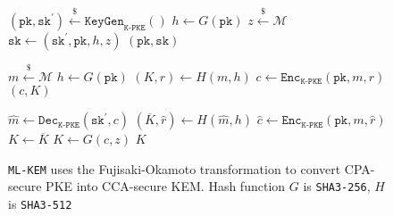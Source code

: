 \documentclass[runningheads]{llncs}
\newcommand{\keygen}{\texttt{KeyGen}}
\newcommand{\encrypt}{\texttt{Enc}}
\newcommand{\decrypt}{\texttt{Dec}}
\newcommand{\encap}{\texttt{Encap}}
\newcommand{\decap}{\texttt{Decap}}
\newcommand{\pk}{\texttt{pk}}
\newcommand{\sk}{\texttt{sk}}
\newcommand{\leftsample}{\stackrel{\$}{\leftarrow}}
\begin{document}
\begin{figure}[h]
    \centering
    
    \begin{minipage}[t]{0.35\textwidth}
        \begin{algorithm}[H]
            \caption*{$\keygen_\texttt{ML-KEM}()$}
            \begin{algorithmic}[1]
                \State $(\pk, \sk^\prime) \leftsample \keygen_\texttt{K-PKE}()$
                \State $h \leftarrow G(\pk)$
                \State $z \leftsample \mathcal{M}$
                \State $\sk \leftarrow (\sk^\prime, \pk, h, z)$
                \State \Return $(\pk, \sk)$
            \end{algorithmic}
        \end{algorithm} \vspace{-0.5cm}
    \end{minipage}
    \begin{minipage}[t]{0.3\textwidth}
        \begin{algorithm}[H]
            \caption*{$\encap_\texttt{ML-KEM}(\pk)$}
            \begin{algorithmic}[1]
                \State $m \leftsample \mathcal{M}$
                \State $h \leftarrow G(\pk)$
                \State $(K, r) \leftarrow H(m, h)$
                \State $c \leftarrow \encrypt_\texttt{K-PKE}(\pk, m ,r)$
                \State \Return $(c, K)$
            \end{algorithmic}
        \end{algorithm}
    \end{minipage}
    \begin{minipage}[t]{0.33\textwidth}
        \begin{algorithm}[H]
            \caption*{$\decap_\texttt{ML-KEM}(\sk, c)$}
            \begin{algorithmic}[1]
                \State $\hat{m} \leftarrow \decrypt_\texttt{K-PKE}(\sk^\prime, c)$
                \State $(\overline{K}, \hat{r}) \leftarrow H(\hat{m}, h)$
                \State $\hat{c} \leftarrow \encrypt_\texttt{K-PKE}(\pk, m, \hat{r})$
                    \State $K \leftarrow \overline{K}$
                \Else 
                    \State $K \leftarrow G(c, z)$
                \EndIf
                \State \Return $K$
            \end{algorithmic}
        \end{algorithm}
    \end{minipage}

    \caption{\texttt{ML-KEM} uses the Fujisaki-Okamoto transformation to convert CPA-secure PKE into CCA-secure KEM. Hash function $G$ is \texttt{SHA3-256}, $H$ is \texttt{SHA3-512}}\label{fig:ml-kem-routines}
\end{figure}
\end{document}
